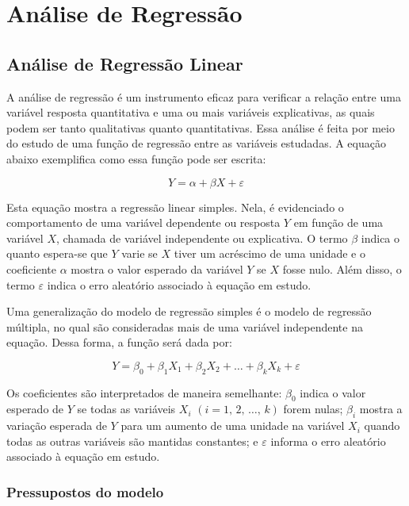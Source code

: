 \documentclass[
  portuguese,
]{estat/estat}
\let\oldsection\section
\renewcommand\section{\clearpage\oldsection}
\begin{document}
\section{Análise de Regressão}\label{anuxe1lise-de-regressuxe3o}

\subsection{Análise de Regressão
Linear}\label{anuxe1lise-de-regressuxe3o-linear}

A análise de regressão é um instrumento eficaz para verificar a relação
entre uma variável resposta quantitativa e uma ou mais variáveis
explicativas, as quais podem ser tanto qualitativas quanto
quantitativas. Essa análise é feita por meio do estudo de uma função de
regressão entre as variáveis estudadas. A equação abaixo exemplifica
como essa função pode ser escrita:

\[
Y=\alpha + \beta X + \varepsilon
\]

Esta equação mostra a regressão linear simples. Nela, é evidenciado o
comportamento de uma variável dependente ou resposta \(Y\) em função de
uma variável \(X\), chamada de variável independente ou explicativa. O
termo \(\beta\) indica o quanto espera-se que \(Y\) varie se \(X\) tiver
um acréscimo de uma unidade e o coeficiente \(\alpha\) mostra o valor
esperado da variável \(Y\) se \(X\) fosse nulo. Além disso, o termo
\(\varepsilon\) indica o erro aleatório associado à equação em estudo.

Uma generalização do modelo de regressão simples é o modelo de regressão
múltipla, no qual são consideradas mais de uma variável independente na
equação. Dessa forma, a função será dada por:

\[
Y=\beta_0 + \beta_1 X_1 + \beta_2 X_2 + \ldots + \beta_k X_k +\varepsilon
\]

Os coeficientes são interpretados de maneira semelhante: \(\beta_0\)
indica o valor esperado de \(Y\) se todas as variáveis \(X_i\)
\((i=1, \, 2,\, \ldots , \, k)\) forem nulas; \(\beta_i\) mostra a
variação esperada de \(Y\) para um aumento de uma unidade na variável
\(X_i\) quando todas as outras variáveis são mantidas constantes; e
\(\varepsilon\) informa o erro aleatório associado à equação em estudo.

\subsubsection{Pressupostos do modelo}\label{pressupostos-do-modelo}
\end{document}
